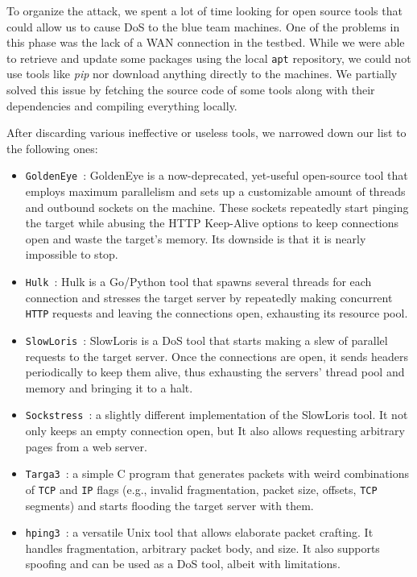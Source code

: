 To organize the attack, we spent a lot of time looking for open source tools that could allow us to cause DoS to the blue team machines. One of the problems in this phase was the lack of a WAN connection in the testbed. While we were able to retrieve and update some packages using the local \texttt{apt} repository, we could not use tools like \textit{pip} nor download anything directly to the machines. 
We partially solved this issue by fetching the source code of some tools along with their dependencies and compiling everything locally.

After discarding various ineffective or useless tools, we narrowed down our list to the following ones: 

\begin{itemize}
    \item \texttt{GoldenEye}~\cite{github:goldeneye}: GoldenEye is a now-deprecated, yet-useful open-source tool that employs maximum parallelism and sets up a customizable amount of threads and outbound sockets on the machine. These sockets repeatedly start pinging the target while abusing the HTTP Keep-Alive options to keep connections open and waste the target's memory. Its downside is that it is nearly impossible to stop.
    \item \texttt{Hulk}~\cite{github:hulk}: Hulk is a Go/Python tool that spawns several threads for each connection and stresses the target server by repeatedly making concurrent \texttt{HTTP} requests and leaving the connections open, exhausting its resource pool.
    \item \texttt{SlowLoris}~\cite{github:slowloris}: SlowLoris is a DoS tool that starts making a slew of parallel requests to the target server. Once the connections are open, it sends headers periodically to keep them alive, thus exhausting the servers' thread pool and memory and bringing it to a halt.
    \item \texttt{Sockstress}~\cite{github:sockstress}: a slightly different implementation of the SlowLoris tool. It not only keeps an empty connection open, but It also allows requesting arbitrary pages from a web server.
    \item \texttt{Targa3}~\cite{github:etccetera}: a simple C program that generates packets with weird combinations of \texttt{TCP} and \texttt{IP} flags (e.g., invalid fragmentation, packet size, offsets, \texttt{TCP} segments) and starts flooding the target server with them.
    \item \texttt{hping3}~\cite{linux-die:hping3}: 
    a versatile Unix tool that allows elaborate packet crafting. It handles fragmentation, arbitrary packet body, and size. It also supports spoofing and can be used as a DoS tool, albeit with limitations. 
\end{itemize}

